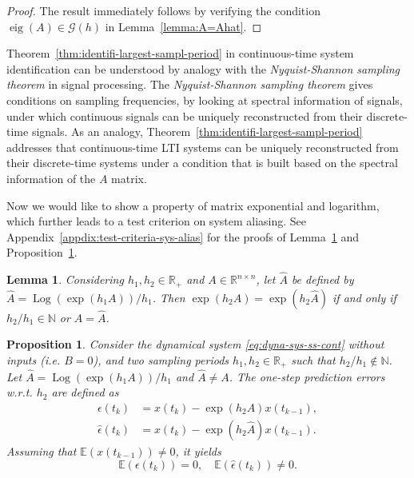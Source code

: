 \documentclass[letterpaper,10pt,journal,final]{IEEEtran}
\newtheorem{lemma}[theorem]{Lemma}
\newtheorem{proposition}[theorem]{Proposition}
\theoremstyle{definition}
\theoremstyle{remark}
\newcommand{\Log}{\operatorname{Log}}
\newcommand{\eig}{\operatorname{eig}}
\begin{document}
\begin{proof}
  The result immediately follows by verifying the condition $\eig(A) \in \mathcal{G}(h)$ in Lemma~\ref{lemma:A=Ahat}.
\end{proof}

Theorem~\ref{thm:identifi-largest-sampl-period} in continuous-time system
identification can be understood by analogy with the \emph{Nyquist-Shannon
  sampling theorem} in signal processing. The \emph{Nyquist-Shannon sampling
  theorem} gives conditions on sampling frequencies, by looking at spectral
information of signals, under which continuous signals can be uniquely
reconstructed from their discrete-time signals. As an analogy,
Theorem~\ref{thm:identifi-largest-sampl-period} addresses that continuous-time
LTI systems can be uniquely reconstructed from their discrete-time systems under
a condition that is built based on the spectral information of the $A$ matrix.

Now we would like to show a property of matrix exponential and logarithm, which
further leads to a test criterion on system aliasing.  See
Appendix~\ref{appdix:test-criteria-sys-alias} for the proofs of
Lemma~\ref{lemma:diff-A-h1h2} and
Proposition~\ref{prop:pred-error-diff-distribution}.
\begin{lemma}
  \label{lemma:diff-A-h1h2}
  Considering $h_1, h_2 \in \mathbb{R}_+$ and $A \in \mathbb{R}^{n \times n}$, let
  $\hat{A}$ be defined by $\hat{A} = \Log(\exp(h_1 A))/h_1$. Then $\exp(h_2 A) =
  \exp(h_2 \hat{A})$ if and only if $h_2/h_1 \in \mathbb{N}$ or $A = \hat{A}$.
\end{lemma}

\begin{proposition}
  \label{prop:pred-error-diff-distribution}
  Consider the dynamical system \eqref{eq:dyna-sys-ss-cont} without inputs (i.e.
  $B = 0$), and two sampling periods $h_1, h_2 \in \mathbb{R}_+$ such that
  $h_2/h_1 \notin \mathbb{N}$.  Let $\hat{A} = \Log(\exp(h_1A))/h_1$ and
  $\hat{A} \neq A$.  The one-step prediction errors w.r.t. $h_2$ are defined as
  \begin{align*}
    \epsilon(t_k) &= x(t_k) - \exp(h_2 A) x(t_{k-1}),\\
    \hat{\epsilon}(t_k) &= x(t_k) - \exp(h_2 \hat{A}) x(t_{k-1}).
  \end{align*}
  Assuming that $\mathbb{E}(x(t_{k-1})) \neq 0$, it yields
  \begin{equation*}
    \mathbb{E}(\epsilon(t_k)) = 0, \quad
    \mathbb{E}(\hat{\epsilon}(t_k)) \neq 0.
  \end{equation*}
\end{proposition}
\end{document}
